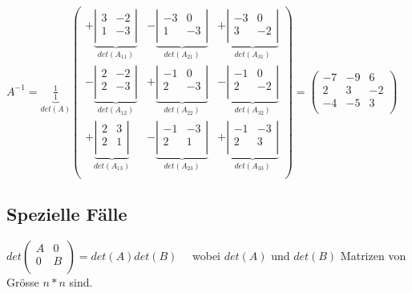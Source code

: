 		$A^{-1}=\underbrace{\frac{1}{1}}_{det(A)}
			\left(\begin{array}{rrr} 
				+\underbrace{\left|\begin{array}{rr} 3 & -2 \\ 1 & -3 \\ \end{array}\right|}_{det(A_{11})} &
				-\underbrace{\left|\begin{array}{rr} -3 & 0 \\ 1 & -3 \\ \end{array}\right|}_{det(A_{21})} &
				+\underbrace{\left|\begin{array}{rr} -3 & 0 \\ 3 & -2 \\ \end{array}\right|}_{det(A_{31})} \\
			
				-\underbrace{\left|\begin{array}{rr} 2 & -2 \\ 2 & -3 \\ \end{array}\right|}_{det(A_{12})} &
				+\underbrace{\left|\begin{array}{rr} -1 & 0 \\ 2 & -3 \\ \end{array}\right|}_{det(A_{22})} &
				-\underbrace{\left|\begin{array}{rr} -1 & 0 \\ 2 & -2 \\ \end{array}\right|}_{det(A_{32})} \\
			
				+\underbrace{\left|\begin{array}{rr} 2 & 3 \\ 2 & 1 \\ \end{array}\right|}_{det(A_{13})} &
				-\underbrace{\left|\begin{array}{rr} -1 & -3 \\ 2 & 1 \\ \end{array}\right|}_{det(A_{23})} &
				+\underbrace{\left|\begin{array}{rr} -1 & -3 \\ 2 & 3 \\ \end{array}\right|}_{det(A_{33})} \\
			\end{array}\right)
			=\left(\begin{array}{rrr} 
				-7 & -9 & 6 \\
				2 & 3 & -2 \\
				-4 & -5 & 3 \\
			\end{array}\right)$
			
\subsection{Spezielle Fälle}
	$det\left(\begin{array}{cc} 
			A & 0 \\
			0 & B \\
		\end{array}\right)=det(A)det(B)$ \ \ wobei $det(A)$ und $det(B)$ Matrizen von Grösse $n*n$ sind.